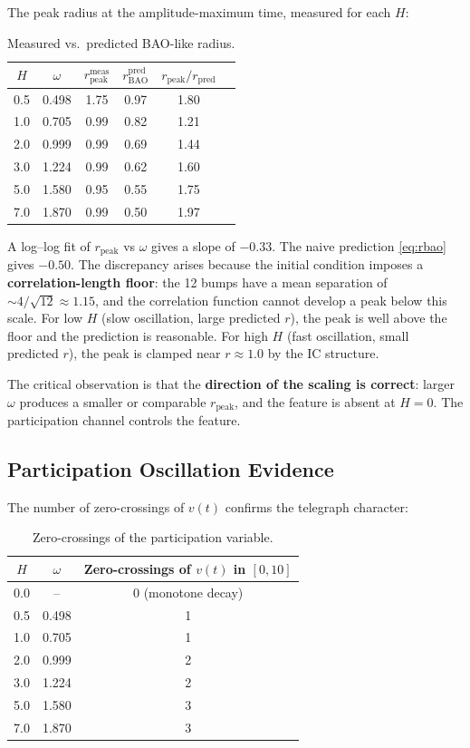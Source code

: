 \documentclass[11pt]{article}
\begin{document}
The peak radius at the amplitude-maximum time, measured for each \(H\):

\begin{table}[h]
\centering
\begin{tabular}{@{}cccccc@{}}
\toprule
\(H\) & \(\omega\) & \(r_{\mathrm{peak}}^{\mathrm{meas}}\) & \(r_{\mathrm{BAO}}^{\mathrm{pred}}\) & \(r_{\mathrm{peak}} / r_{\mathrm{pred}}\) \\
\midrule
0.5 & 0.498 & 1.75 & 0.97 & 1.80 \\
1.0 & 0.705 & 0.99 & 0.82 & 1.21 \\
2.0 & 0.999 & 0.99 & 0.69 & 1.44 \\
3.0 & 1.224 & 0.99 & 0.62 & 1.60 \\
5.0 & 1.580 & 0.95 & 0.55 & 1.75 \\
7.0 & 1.870 & 0.99 & 0.50 & 1.97 \\
\bottomrule
\end{tabular}
\caption{Measured vs.\ predicted BAO-like radius.}
\label{tab:radius}
\end{table}

A log--log fit of \(r_{\mathrm{peak}}\) vs \(\omega\) gives a slope of \(-0.33\). The naive prediction \eqref{eq:rbao} gives \(-0.50\). The discrepancy arises because the initial condition imposes a \textbf{correlation-length floor}: the 12 bumps have a mean separation of \(\sim 4/\sqrt{12} \approx 1.15\), and the correlation function cannot develop a peak below this scale. For low \(H\) (slow oscillation, large predicted \(r\)), the peak is well above the floor and the prediction is reasonable. For high \(H\) (fast oscillation, small predicted \(r\)), the peak is clamped near \(r \approx 1.0\) by the IC structure.

The critical observation is that the \textbf{direction of the scaling is correct}: larger \(\omega\) produces a smaller or comparable \(r_{\mathrm{peak}}\), and the feature is absent at \(H = 0\). The participation channel controls the feature.

\subsection{Participation Oscillation Evidence}

The number of zero-crossings of \(v(t)\) confirms the telegraph character:

\begin{table}[h]
\centering
\begin{tabular}{@{}ccc@{}}
\toprule
\(H\) & \(\omega\) & Zero-crossings of \(v(t)\) in \([0, 10]\) \\
\midrule
0.0 & -- & 0 (monotone decay) \\
0.5 & 0.498 & 1 \\
1.0 & 0.705 & 1 \\
2.0 & 0.999 & 2 \\
3.0 & 1.224 & 2 \\
5.0 & 1.580 & 3 \\
7.0 & 1.870 & 3 \\
\bottomrule
\end{tabular}
\caption{Zero-crossings of the participation variable.}
\label{tab:zerocrossings}
\end{table}
\end{document}
